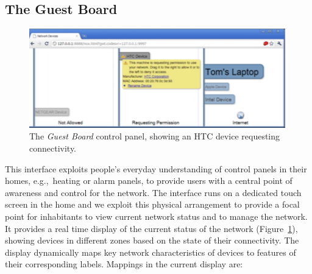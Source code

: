 



\subsection{The Guest Board} \label{s:guest-board}


\begin{figure} \centering \includegraphics[width=\columnwidth]{control}
  \caption{\label{f:guest-board}The \emph{Guest Board} control panel, showing an
    HTC device requesting connectivity.} \vspace{-1em} \end{figure}

This interface exploits people's everyday understanding of control panels in
their homes, e.g.,~heating or alarm panels, to provide users with a central
point of awareness and control for the network.  The interface runs on a
dedicated touch screen in the home and we exploit this physical arrangement to
provide a focal point for inhabitants to view current network status and to
manage the network.  It provides a real time display of the current status of
the network (Figure~\ref{f:guest-board}), showing devices in different zones
based on the state of their connectivity.  The display dynamically maps key
network characteristics of devices to features of their corresponding labels.
Mappings in the current display are: 

